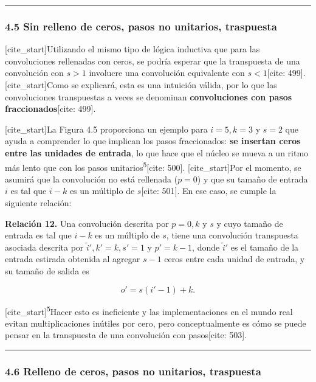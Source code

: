 \documentclass[
  super,
  preprint,
  3p]{elsarticle}
\begin{document}
\begin{center}\rule{0.5\linewidth}{0.5pt}\end{center}

\subsubsection{4.5 Sin relleno de ceros, pasos no unitarios,
traspuesta}\label{sin-relleno-de-ceros-pasos-no-unitarios-traspuesta}

{[}cite\_start{]}Utilizando el mismo tipo de lógica inductiva que para
las convoluciones rellenadas con ceros, se podría esperar que la
transpuesta de una convolución con \(s > 1\) involucre una convolución
equivalente con \(s < 1\){[}cite: 499{]}. {[}cite\_start{]}Como se
explicará, esta es una intuición válida, por lo que las convoluciones
transpuestas a veces se denominan \textbf{convoluciones con pasos
fraccionados}{[}cite: 499{]}.

{[}cite\_start{]}La Figura 4.5 proporciona un ejemplo para
\(i = 5, k = 3\) y \(s = 2\) que ayuda a comprender lo que implican los
pasos fraccionados: \textbf{se insertan ceros entre las unidades de
entrada}, lo que hace que el núcleo se mueva a un ritmo más lento que
con los pasos unitarios\textsuperscript{5}{[}cite: 500{]}.
{[}cite\_start{]}Por el momento, se asumirá que la convolución no está
rellenada (\(p = 0\)) y que su tamaño de entrada \(i\) es tal que
\(i - k\) es un múltiplo de \(s\){[}cite: 501{]}. En ese caso, se cumple
la siguiente relación:

\textbf{Relación 12.} Una convolución descrita por \(p = 0, k\) y \(s\)
y cuyo tamaño de entrada es tal que \(i - k\) es un múltiplo de \(s\),
tiene una convolución transpuesta asociada descrita por
\(\tilde{i}', k' = k, s' = 1\) y \(p' = k - 1\), donde \(\tilde{i}'\) es
el tamaño de la entrada estirada obtenida al agregar \(s - 1\) ceros
entre cada unidad de entrada, y su tamaño de salida es

\[o' = s(i' - 1) + k.\]

{[}cite\_start{]}\textsuperscript{5}Hacer esto es ineficiente y las
implementaciones en el mundo real evitan multiplicaciones inútiles por
cero, pero conceptualmente es cómo se puede pensar en la transpuesta de
una convolución con pasos{[}cite: 503{]}.

\begin{center}\rule{0.5\linewidth}{0.5pt}\end{center}

\subsubsection{4.6 Relleno de ceros, pasos no unitarios,
traspuesta}\label{relleno-de-ceros-pasos-no-unitarios-traspuesta}
\end{document}
